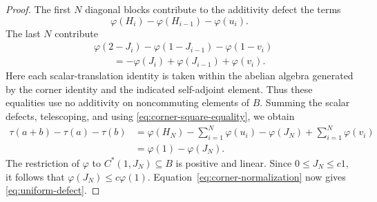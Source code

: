 \begin{proof}
The first $N$ diagonal blocks contribute to the additivity defect the
terms
\[
  \varphi(H_i)-\varphi(H_{i-1})-\varphi(u_i).
\]
The last $N$ contribute
\begin{align*}
  &\varphi(2-J_i)-\varphi(1-J_{i-1})-\varphi(1-v_i)\\
  &\hspace{2em}=-\varphi(J_i)+\varphi(J_{i-1})+\varphi(v_i).
\end{align*}
Here each scalar-translation identity is taken within the abelian
algebra generated by the corner identity and the indicated
self-adjoint element.  Thus these equalities use no additivity on
noncommuting elements of $B$.  Summing the scalar defects,
telescoping, and using \eqref{eq:corner-square-equality}, we obtain
\begin{align*}
  \tau(a+b)-\tau(a)-\tau(b)
    &=\varphi(H_N)-\sum_{i=1}^N\varphi(u_i)
      -\varphi(J_N)+\sum_{i=1}^N\varphi(v_i)\\
    &=\varphi(1)-\varphi(J_N).
\end{align*}
The restriction of $\varphi$ to $C^*(1,J_N)\subseteq B$ is positive
and linear.  Since $0\le J_N\le c1$, it follows that
$\varphi(J_N)\le c\varphi(1)$.  Equation~\eqref{eq:corner-normalization}
now gives \eqref{eq:uniform-defect}.
\end{proof}
